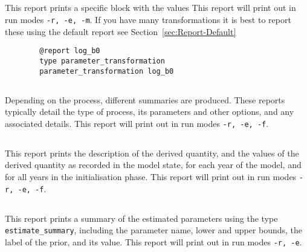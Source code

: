 \fi

\subsection{}\label{sec:Report-ParameterTransformations}

This report prints a specific  block with the values This report will print out in run modes \texttt{-r, -e, -m}. If you have many transformations it is best to report these using the default report see Section~\ref{sec:Report-Default}

{\small{\begin{verbatim}
		@report log_b0
		type parameter_transformation
		parameter_transformation log_b0
		\end{verbatim}}}

\subsection{}\label{sec:Report-Process}

Depending on the process, different summaries are produced. These reports typically detail the type of process, its parameters and other options, and any associated details. This report will print out in run modes \texttt{-r, -e, -f}.

\subsection{}\label{sec:Report-DerivedQuantity}

This report prints the description of the derived quantity, and the values of the derived quantity as recorded in the model state, for each year of the model, and for all years in the initialisation phase. This report will print out in run modes \texttt{-r, -e, -f}.

\subsection{}\label{sec:Report-EstimateSummary}

This report prints a summary of the estimated parameters using the type \texttt{estimate\_summary}, including the parameter name, lower and upper bounds, the label of the prior, and its value. This report will print out in run modes \texttt{-r, -e}.

